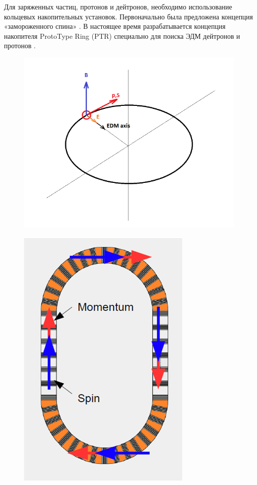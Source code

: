 \documentclass[final]{beamer}
\begin{document}
\begin{frame}[t]
\begin{multicols}{3}
Для заряженных частиц, протонов и дейтронов, необходимо использование кольцевых накопительных установок. Первоначально была предложена концепция «замороженного спина» \cite{ref4}. В настоящее время разрабатывается концепция накопителя ProtoType Ring (PTR) специально для поиска ЭДМ дейтронов и протонов \cite{ref5}.
\begin{figure}[h]
            \centering
            \includegraphics[height=.2\textheight]{FS.png}
\end{figure}

\begin{figure}[h]
            \centering
            \includegraphics[height=.2\textheight]{FS ring.png}
\end{figure}


\end{multicols}
\end{frame}
\end{document}
